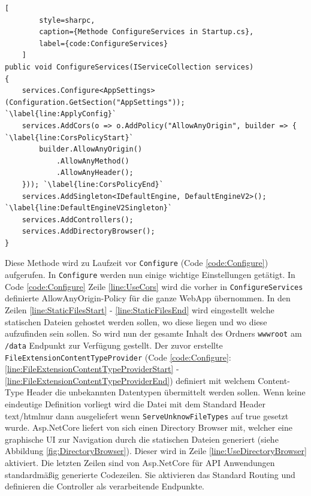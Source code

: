 \begin{codeblock}
	\begin{lstlisting}[
		style=sharpc,
		caption={Methode ConfigureServices in Startup.cs},
		label={code:ConfigureServices}
	]
public void ConfigureServices(IServiceCollection services)
{
	services.Configure<AppSettings>(Configuration.GetSection("AppSettings"));	`\label{line:ApplyConfig}`
	services.AddCors(o => o.AddPolicy("AllowAnyOrigin", builder => { `\label{line:CorsPolicyStart}`
		builder.AllowAnyOrigin()
			.AllowAnyMethod()
			.AllowAnyHeader();
	})); `\label{line:CorsPolicyEnd}`
	services.AddSingleton<IDefaultEngine, DefaultEngineV2>(); `\label{line:DefaultEngineV2Singleton}`
	services.AddControllers();
	services.AddDirectoryBrowser();
}
	\end{lstlisting}
\end{codeblock}

Diese Methode wird zu Laufzeit vor \texttt{Configure}
(Code \ref{code:Configure}) aufgerufen. In \texttt{Configure} werden nun
einige wichtige Einstellungen getätigt. In Code \ref{code:Configure}
Zeile \ref{line:UseCors} wird die vorher in \texttt{ConfigureServices} definierte
\grqq AllowAnyOrigin\grqq -Policy für die ganze WebApp übernommen.
In den Zeilen \ref{line:StaticFilesStart} - \ref{line:StaticFilesEnd}
wird eingestellt welche statischen Dateien gehostet werden sollen,
wo diese liegen und wo diese aufzufinden sein sollen. So wird nun
der gesamte Inhalt des Ordners \texttt{wwwroot} am \texttt{/data} Endpunkt zur
Verfügung gestellt. Der zuvor erstellte \texttt{FileExtensionContentTypeProvider}
(Code \ref{code:Configure}:
\ref{line:FileExtensionContentTypeProviderStart} -
\ref{line:FileExtensionContentTypeProviderEnd})
definiert mit welchem Content-Type Header die \grqq unbekannten\grqq\space
Datentypen übermittelt werden sollen. Wenn keine eindeutige
Definition vorliegt wird die Datei mit dem Standard Header
\grqq text/html\grqq\space nur dann ausgeliefert wenn \texttt{ServeUnknowFileTypes} auf
true gesetzt wurde.
Asp.NetCore liefert von sich einen Directory Browser mit,
welcher eine graphische UI zur Navigation durch die statischen
Dateien generiert (siehe Abbildung \ref{fig:DirectoryBrowser}).
Dieser wird in Zeile \ref{line:UseDirectoryBrowser} aktiviert.
Die letzten Zeilen sind von Asp.NetCore für API Anwendungen
standardmäßig generierte Codezeilen. Sie aktivieren das Standard
Routing und definieren die Controller als verarbeitende Endpunkte.

